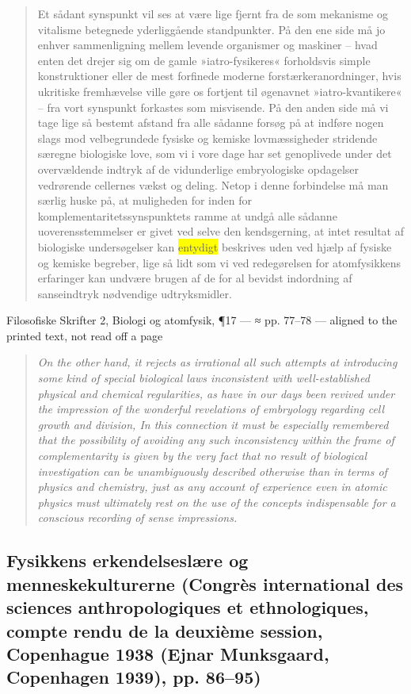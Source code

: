 \documentclass[11pt]{article}
\newcommand{\dcite}[1]{{\nopagebreak\raggedleft\small #1\par}\medskip}
\newcommand{\tlg}[1]{{\setlength{\fboxsep}{0.8pt}\colorbox{yellow}{#1}}}
\newcommand{\olg}[1]{{\setlength{\fboxsep}{0.8pt}\colorbox{cyan!25}{#1}}}
\begin{document}
\begin{quote}
Et sådant synspunkt vil ses at være lige fjernt fra de som mekanisme og vitalisme betegnede yderliggående standpunkter. På den ene side må jo enhver sammenligning mellem levende organismer og maskiner – hvad enten det drejer sig om de gamle »iatro-fysikeres« forholdsvis simple konstruktioner eller de mest forfinede moderne forstærkeranordninger, hvis ukritiske fremhævelse ville gøre os fortjent til øgenavnet »iatro-kvantikere« – fra vort synspunkt forkastes som misvisende. På den anden side må vi tage lige så bestemt afstand fra alle sådanne forsøg på at indføre nogen slags mod velbegrundede fysiske og kemiske lovmæssigheder stridende særegne biologiske love, som vi i vore dage har set genoplivede under det overvældende indtryk af de vidunderlige embryologiske opdagelser vedrørende cellernes vækst og deling. Netop i denne forbindelse må man særlig huske på, at muligheden for inden for komplementaritetssynspunktets ramme at undgå alle sådanne uoverensstemmelser er givet ved selve den kendsgerning, at intet resultat af biologiske undersøgelser kan \tlg{entydigt} beskrives uden ved hjælp af fysiske og kemiske begreber, lige så lidt som vi ved redegørelsen for atomfysikkens erfaringer kan undvære brugen af de for al bevidst indordning af sanseindtryk nødvendige udtryksmidler.
\end{quote}
\dcite{Filosofiske Skrifter 2, Biologi og atomfysik, ¶17 — ≈ pp. 77–78 — aligned to the printed text, not read off a page}
{\footnotesize\begin{quote}\itshape
On the other hand, it rejects as irrational all such attempts at introducing some kind of special biological laws inconsistent with well-established physical and chemical regularities, as have in our days been revived under the impression of the wonderful revelations of embryology regarding cell growth and division, In this connection it must be especially remembered that the possibility of avoiding any such inconsistency within the frame of complementarity is given by the very fact that no result of biological investigation can be \olg{unambiguously} described otherwise than in terms of physics and chemistry, just as any account of experience even in atomic physics must ultimately rest on the use of the concepts indispensable for a conscious recording of sense impressions.
\end{quote}}

\subsection{Fysikkens erkendelseslære og menneskekulturerne \normalfont(Congrès international des sciences anthropologiques et ethnologiques, compte rendu de la deuxième session, Copenhague 1938 (Ejnar Munksgaard, Copenhagen 1939), pp. 86–95)}
\end{document}
